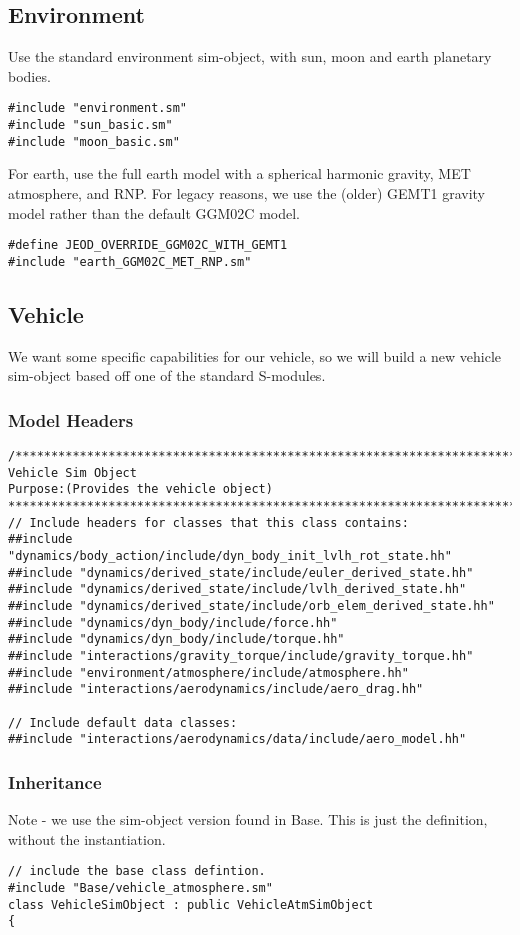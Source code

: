\documentclass[twoside,11pt,titlepage]{report}
\begin{document}
\subsection{Environment}
Use the standard environment sim-object, with sun, moon and earth planetary
bodies.

\begin{verbatim}
#include "environment.sm"
#include "sun_basic.sm"
#include "moon_basic.sm"
\end{verbatim}
For earth, use the full earth model with a spherical harmonic gravity, MET
atmosphere, and RNP.  For legacy reasons, we use the (older) GEMT1 gravity
model rather than the default GGM02C model.
\begin{verbatim}
#define JEOD_OVERRIDE_GGM02C_WITH_GEMT1
#include "earth_GGM02C_MET_RNP.sm"
\end{verbatim}


\subsection{Vehicle}
We want some specific capabilities for our vehicle, so we will build a new
vehicle sim-object based off one of the standard S-modules.

\subsubsection{Model Headers}
\begin{verbatim}
/*****************************************************************************
Vehicle Sim Object
Purpose:(Provides the vehicle object)
*****************************************************************************/
// Include headers for classes that this class contains:
##include "dynamics/body_action/include/dyn_body_init_lvlh_rot_state.hh"
##include "dynamics/derived_state/include/euler_derived_state.hh"
##include "dynamics/derived_state/include/lvlh_derived_state.hh"
##include "dynamics/derived_state/include/orb_elem_derived_state.hh"
##include "dynamics/dyn_body/include/force.hh"
##include "dynamics/dyn_body/include/torque.hh"
##include "interactions/gravity_torque/include/gravity_torque.hh"
##include "environment/atmosphere/include/atmosphere.hh"
##include "interactions/aerodynamics/include/aero_drag.hh"

// Include default data classes:
##include "interactions/aerodynamics/data/include/aero_model.hh"
\end{verbatim}

\subsubsection{Inheritance}
Note - we use the sim-object version found in Base.  This is just the
definition, without the instantiation.
\begin{verbatim}
// include the base class defintion.
#include "Base/vehicle_atmosphere.sm"
class VehicleSimObject : public VehicleAtmSimObject
{
\end{verbatim}
\end{document}
